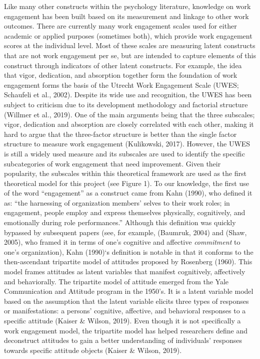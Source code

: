 \documentclass[
  english,
  man]{apa7}
\begin{document}
Like many other constructs within the psychology literature, knowledge on work engagement has been built based on its measurement and linkage to other work outcomes. There are currently many work engagement scales used for either academic or applied purposes (sometimes both), which provide work engagement scores at the individual level. Most of these scales are measuring latent constructs that are not work engagement per se, but are intended to capture elements of this construct through indicators of other latent constructs. For example, the idea that vigor, dedication, and absorption together form the foundation of work engagement forms the basis of the Utrecht Work Engagement Scale (UWES; Schaufeli et al., 2002). Despite its wide use and recognition, the UWES has been subject to criticism due to its development methodology and factorial structure (Willmer et al., 2019). One of the main arguments being that the three subscales; vigor, dedication and absorption are closely correlated with each other, making it hard to argue that the three-factor structure is better than the single factor structure to measure work engagement (Kulikowski, 2017). However, the UWES is still a widely used measure and its subscales are used to identify the specific subcategories of work engagement that need improvement. Given their popularity, the subscales within this theoretical framework are used as the first theoretical model for this project (see Figure 1).
To our knowledge, the first use of the word ``engagement'' as a construct came from Kahn (1990), who defined it as: ``the harnessing of organization members' selves to their work roles; in engagement, people employ and express themselves physically, cognitively, and emotionally during role performances.'' Although this definition was quickly bypassed by subsequent papers (see, for example, (Baumruk, 2004) and (Shaw, 2005), who framed it in terms of one's cognitive and affective \emph{commitment} to one's organization), Kahn (1990)`s definition is notable in that it conforms to the then-ascendant tripartite model of attitudes proposed by Rosenberg (1960). This model frames attitudes as latent variables that manifest cognitively, affectively and behaviorally. The tripartite model of attitude emerged from the Yale Communication and Attitude program in the 1950's. It is a latent variable model based on the assumption that the latent variable elicits three types of responses or manifestations: a persons' cognitive, affective, and behavioral responses to a specific attitude (Kaiser \& Wilson, 2019). Even though it is not specifically a work engagement model, the tripartite model has helped researchers define and deconstruct attitudes to gain a better understanding of individuals' responses towards specific attitude objects (Kaiser \& Wilson, 2019).
\end{document}
